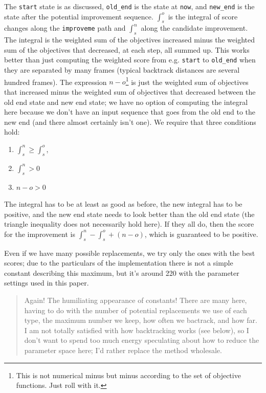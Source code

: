 \documentclass[twocolumn]{article}
\newcommand\parameteralert[1]{
  \begin{quotation}
  \noindent {\bf Parameter Alert!} #1
  \end{quotation}
}
\begin{document}
The {\tt start} state is as discussed, {\tt old\_end} is the state at
{\tt now}, and {\tt new\_end} is the state after the potential
improvement sequence. $\int_s^o$ is the integral of score changes
along the {\tt improveme} path and $\int_s^n$ along the candidate
improvement. The integral is the weighted sum of the objectives
increased minus the weighted sum of the objectives that decreased, at
each step, all summed up. This works better than just computing the
weighted score from e.g. {\tt start} to {\tt old\_end} when they are
separated by many frames (typical backtrack distances are several
hundred frames). The expression $n-o$\footnote{This is not numerical
  minus but minus according to the set of objective functions. Just
  roll with it.} is just the weighted sum of objectives that increased
minus the weighted sum of objectives that decreased between the old
end state and new end state; we have no option of computing the
integral here because we don't have an input sequence that goes from
the old end to the new end (and there almost certainly isn't one). We
require that three conditions hold:
\begin{enumerate}
\item $\int_s^n \geq \int_s^o$,
\item $\int_s^n > 0$
\item $n - o > 0$
\end{enumerate}

The integral has to be at least as good as before, the new integral
has to be positive, and the new end state needs to look better than
the old end state (the triangle inequality does not necessarily hold
here). If they all do, then the score for the improvement is $\int_s^n
- \int_s^o + (n - o)$, which is guaranteed to be positive.

Even if we have many possible replacements, we try only the ones with
the best scores; due to the particulars of the implementation there is
not a simple constant describing this maximum, but it's around 220
with the parameter settings used in this paper.

\parameteralert{
  Again! The humiliating appearance of constants! There are many here,
  having to do with the number of potential replacements we use of
  each type, the maximum number we keep, how often we bactrack, and
  how far. I am not totally satisfied with how backtracking works (see
  below), so I don't want to spend too much energy speculating about
  how to reduce the parameter space here; I'd rather replace the
  method wholesale.}
\end{document}
